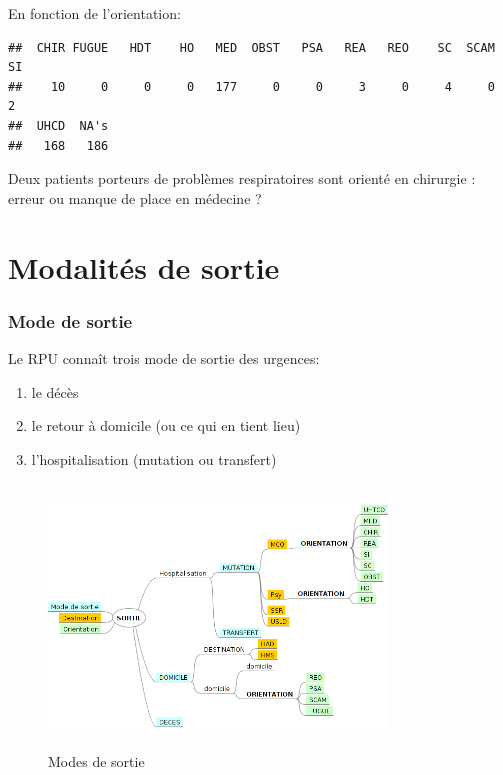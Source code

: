\documentclass[12pt,english,french,twoside]{report}\usepackage[]{graphicx}\usepackage[]{color}
\makeatletter
\newenvironment{kframe}{%
 \def\at@end@of@kframe{}%
 \ifinner\ifhmode%
  \def\at@end@of@kframe{\end{minipage}}%
  \begin{minipage}{\columnwidth}%
 \fi\fi%
 \def\FrameCommand##1{\hskip\@totalleftmargin \hskip-\fboxsep
 \colorbox{shadecolor}{##1}\hskip-\fboxsep
     \hskip-\linewidth \hskip-\@totalleftmargin \hskip\columnwidth}%
 \MakeFramed {\advance\hsize-\width
   \@totalleftmargin\z@ \linewidth\hsize
   \@setminipage}}%
 {\par\unskip\endMakeFramed%
 \at@end@of@kframe}
\newenvironment{knitrout}{}{} %
\makeatother
\begin{document}
En fonction de l'orientation:
\begin{knitrout}
\color{fgcolor}\begin{kframe}
\begin{verbatim}
##  CHIR FUGUE   HDT    HO   MED  OBST   PSA   REA   REO    SC  SCAM    SI 
##    10     0     0     0   177     0     0     3     0     4     0     2 
##  UHCD  NA's 
##   168   186
\end{verbatim}
\end{kframe}
\end{knitrout}


Deux patients porteurs de problèmes respiratoires sont orienté en chirurgie : erreur ou manque de place en médecine ?


\chapter{Modalités de sortie}


\subsection{Mode de sortie}

Le RPU connaît trois mode de sortie des urgences:
\begin{enumerate}
  \item le décès
  \item le retour à domicile (ou ce qui en tient lieu)
  \item l'hospitalisation (mutation ou transfert)
\end{enumerate}

 \begin{figure}[h]
 \centering
 \includegraphics[width=9cm,height=7cm,bb=0 0 669 437]{figure/Mode de SORTIE.png}
 \caption{Modes de sortie}
\end{figure}
\end{document}
